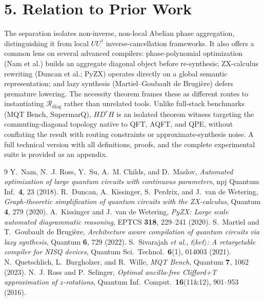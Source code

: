 \documentclass[11pt]{article}
\begin{document}
\section*{5. Relation to Prior Work}

The separation isolates non-inverse, non-local Abelian phase aggregation, distinguishing it from
local $UU^\dagger$ inverse-cancellation frameworks. It also offers a common lens on several advanced
compilers: phase-polynomial optimization (Nam et al.) builds an aggregate diagonal object before
re-synthesis; ZX-calculus rewriting (Duncan et al.; PyZX) operates directly on a global semantic
representation; and lazy synthesis (Martiel--Goubault de Brugi\`ere) defers premature lowering. The
necessity theorem frames these as different routes to instantiating $\mathcal{R}_{\mathrm{diag}}$
rather than unrelated tools. Unlike full-stack benchmarks (MQT Bench, SupermarQ), $HD^rH$ is an
isolated theorem witness targeting the commuting-diagonal topology native to QFT, AQFT, and QPE,
without conflating the result with routing constraints or approximate-synthesis noise. A full
technical version with all definitions, proofs, and the complete experimental suite is provided as an
appendix.

\clearpage
\begin{thebibliography}{9}
\small
{} Y.~Nam, N.~J. Ross, Y.~Su, A.~M. Childs, and D.~Maslov, \emph{Automated optimization of
large quantum circuits with continuous parameters}, npj Quantum Inf.\ \textbf{4}, 23 (2018).
 R.~Duncan, A.~Kissinger, S.~Perdrix, and J.~van de Wetering, \emph{Graph-theoretic
simplification of quantum circuits with the ZX-calculus}, Quantum \textbf{4}, 279 (2020).
 A.~Kissinger and J.~van de Wetering, \emph{PyZX: Large scale automated diagrammatic
reasoning}, EPTCS \textbf{318}, 229--241 (2020).
 S.~Martiel and T.~Goubault de Brugi\`ere, \emph{Architecture aware compilation of
quantum circuits via lazy synthesis}, Quantum \textbf{6}, 729 (2022).
 S.~Sivarajah \emph{et al.}, \emph{t$|$ket$\rangle$: A retargetable compiler for NISQ
devices}, Quantum Sci.\ Technol.\ \textbf{6}(1), 014003 (2021).
 N.~Quetschlich, L.~Burgholzer, and R.~Wille, \emph{MQT Bench}, Quantum \textbf{7}, 1062
(2023).
 N.~J. Ross and P.~Selinger, \emph{Optimal ancilla-free Clifford+T approximation of
$z$-rotations}, Quantum Inf.\ Comput.\ \textbf{16}(11\&12), 901--953 (2016).
\end{thebibliography}
\end{document}
